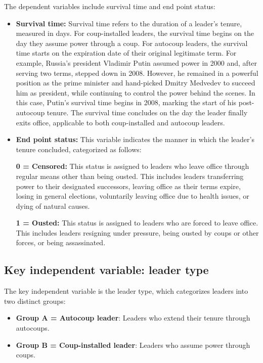 \documentclass[
  12pt,
]{article}
\providecommand{\tightlist}{%
  \setlength{\itemsep}{0pt}\setlength{\parskip}{0pt}}\usepackage{longtable,booktabs,array}
\begin{document}
The dependent variables include survival time and end point status:

\begin{itemize}
\item
  \textbf{Survival time:} Survival time refers to the duration of a
  leader's tenure, measured in days. For coup-installed leaders, the
  survival time begins on the day they assume power through a coup. For
  autocoup leaders, the survival time starts on the expiration date of
  their original legitimate term. For example, Russia's president
  Vladimir Putin assumed power in 2000 and, after serving two terms,
  stepped down in 2008. However, he remained in a powerful position as
  the prime minister and hand-picked Dmitry Medvedev to succeed him as
  president, while continuing to control the power behind the scenes. In
  this case, Putin's survival time begins in 2008, marking the start of
  his post-autocoup tenure. The survival time concludes on the day the
  leader finally exits office, applicable to both coup-installed and
  autocoup leaders.
\item
  \textbf{End point status:} This variable indicates the manner in which
  the leader's tenure concluded, categorized as follows:

  \textbf{0 = Censored:} This status is assigned to leaders who leave
  office through regular means other than being ousted. This includes
  leaders transferring power to their designated successors, leaving
  office as their terms expire, losing in general elections, voluntarily
  leaving office due to health issues, or dying of natural causes.

  \textbf{1 = Ousted:} This status is assigned to leaders who are forced
  to leave office. This includes leaders resigning under pressure, being
  ousted by coups or other forces, or being assassinated.
\end{itemize}

\subsection{Key independent variable: leader
type}\label{key-independent-variable-leader-type}

The key independent variable is the leader type, which categorizes
leaders into two distinct groups:

\begin{itemize}
\tightlist
\item
  \textbf{Group A = Autocoup leader}: Leaders who extend their tenure
  through autocoups.
\item
  \textbf{Group B = Coup-installed leader}: Leaders who assume power
  through coups.
\end{itemize}
\end{document}
